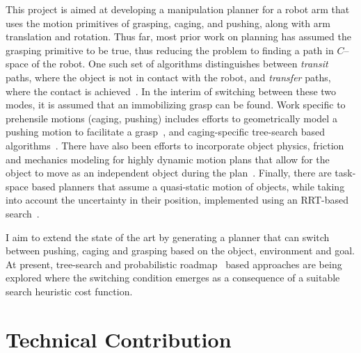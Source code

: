 \documentclass[runningheads,letterpaper]{llncs}
\begin{document}
This project is aimed at developing a manipulation planner for a robot arm that uses the motion primitives of grasping, caging, and pushing, along with arm translation and rotation. Thus far, most prior work on planning has assumed the grasping primitive to be true, thus reducing the problem to finding a path in $C$--space of the robot. One such set of algorithms distinguishes between \textit{transit} paths, where the object is not in contact with the robot, and \textit{transfer} paths, where the contact is achieved~\cite{alami1994two}. In the interim of switching between these two modes, it is assumed that an immobilizing grasp can be found. Work specific to prehensile motions (caging, pushing) includes efforts to geometrically model a pushing motion to facilitate a grasp~\cite{dogar2010push}, and caging-specific tree-search based algorithms~\cite{diankov2008manipulation}. There have also been efforts to incorporate object physics, friction and mechanics modeling for highly dynamic motion plans that allow for the object to move as an independent object during the plan~\cite{dogar2012physics}. Finally, there are task-space based planners that assume a quasi-static motion of objects, while taking into account the uncertainty in their position, implemented using an RRT-based search~\cite{berenson2009addressing}.

I aim to extend the state of the art by generating a planner that can switch between pushing, caging and grasping based on the object, environment and goal. At present, tree-search and probabilistic roadmap~\cite{kavraki2016motion} based approaches are being explored where the switching condition emerges as a consequence of a suitable search heuristic cost function.


\section{Technical Contribution}



\end{document}
